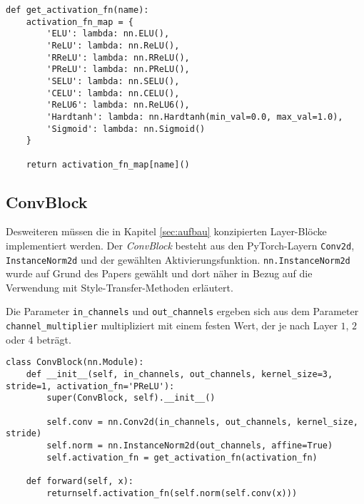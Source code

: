 \begin{listing}[H]
\begin{verbatim}
def get_activation_fn(name):
    activation_fn_map = {
        'ELU': lambda: nn.ELU(),
        'ReLU': lambda: nn.ReLU(),
        'RReLU': lambda: nn.RReLU(),
        'PReLU': lambda: nn.PReLU(),
        'SELU': lambda: nn.SELU(),
        'CELU': lambda: nn.CELU(),
        'ReLU6': lambda: nn.ReLU6(),
        'Hardtanh': lambda: nn.Hardtanh(min_val=0.0, max_val=1.0),
        'Sigmoid': lambda: nn.Sigmoid()
    }

    return activation_fn_map[name]()
\end{verbatim}
\end{listing}

\subsection{ConvBlock}

Desweiteren müssen die in Kapitel \ref{sec:aufbau} konzipierten Layer-Blöcke implementiert werden.
Der \textit{ConvBlock} besteht aus den PyTorch-Layern \texttt{Conv2d}, \texttt{InstanceNorm2d} und der gewählten Aktivierungsfunktion.
\texttt{nn.InstanceNorm2d} wurde auf Grund des Papers \cite{DBLP:journals/corr/UlyanovVL16} gewählt und dort näher in Bezug auf die Verwendung mit Style-Transfer-Methoden erläutert.

\pagebreak

Die Parameter \texttt{in_channels} und \texttt{out_channels} ergeben sich aus dem Parameter \texttt{channel_multiplier} multipliziert mit einem festen Wert, der je nach Layer $ 1 $, $ 2 $ oder $ 4 $ beträgt.

\begin{listing}[H]
\begin{verbatim}
class ConvBlock(nn.Module):
    def __init__(self, in_channels, out_channels, kernel_size=3, stride=1, activation_fn='PReLU'):
        super(ConvBlock, self).__init__()

        self.conv = nn.Conv2d(in_channels, out_channels, kernel_size, stride)
        self.norm = nn.InstanceNorm2d(out_channels, affine=True)
        self.activation_fn = get_activation_fn(activation_fn)

    def forward(self, x):
        returnself.activation_fn(self.norm(self.conv(x)))
\end{verbatim}
\end{listing}


